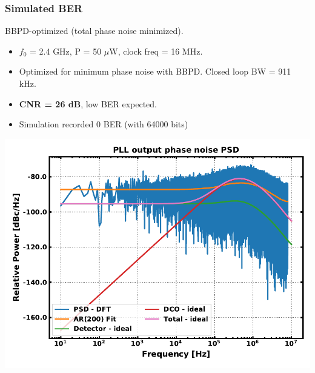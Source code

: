 \documentclass[t, screen, aspectratio=43]{beamer}
\begin{document}
\begin{frame}
	\frametitle{Simulated BER}
	\begin{block}{BBPD-optimized (total phase noise minimized).}
	\begin{minipage}{5cm}
		\begin{itemize}
			\scriptsize
			\item $f_0$ = 2.4 GHz, P = 50 $\mu$W, clock freq = 16 MHz.
			\item Optimized for minimum phase noise with BBPD. Closed loop BW = 911 kHz.
			\item \textbf{CNR = 26 dB}, low BER expected.
			\item Simulation recorded 0 BER (with 64000 bits)
		\end{itemize} 	
	\end{minipage}
	\begin{minipage}{6cm}
		\vspace{1em}
		\hspace{1em}\includegraphics[width=1\textwidth, angle=0]{trans_phase_noise_fast.pdf}
	\end{minipage}
	\end{block}
\end{frame}
\end{document}
